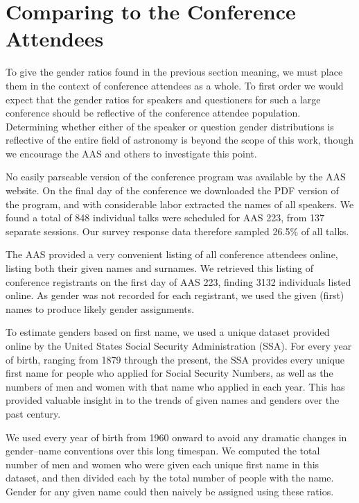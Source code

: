 \documentclass[iop]{emulateapj}
\begin{document}
\section{Comparing to the Conference Attendees} 
To give the gender ratios found in the previous section meaning, we must place them in the context of conference attendees as a whole. To first order we would expect that the gender ratios for speakers and questioners for such a large conference should be reflective of the conference attendee population. Determining whether either of the speaker or question gender distributions is reflective of the entire field of astronomy is beyond the scope of this work, though we encourage the AAS and others to investigate this point.


No easily parseable version of the conference program was available by the AAS website. %
On the final day of the conference we downloaded the PDF version of the program, and with considerable labor extracted the names of all speakers. We found a total of 848 individual talks were scheduled for AAS 223, from 137 separate sessions. Our survey response data therefore sampled 26.5\% of all talks.

The AAS provided a very convenient listing of all conference attendees online, listing both their given names and surnames. We retrieved this listing of conference registrants on the first day of AAS 223, finding 3132 individuals listed online. As gender was not recorded for each registrant, we used the given (first) names to produce likely gender assignments.

To estimate genders based on first name, we used a unique dataset provided online by the United States Social Security Administration (SSA). For every year of birth, ranging from 1879 through the present, the SSA provides every unique first name for people who applied for Social Security Numbers, as well as the numbers of men and women with that name who applied in each year. This has provided valuable insight in to the trends of given names and genders over the past century.


We used every year of birth from 1960 onward to avoid any dramatic changes in gender--name conventions over this long timespan. We computed the total number of men and women who were given each unique first name in this dataset, and then divided each by the total number of people with the name. Gender for any given name could then naively be assigned using these ratios. 
\end{document}
